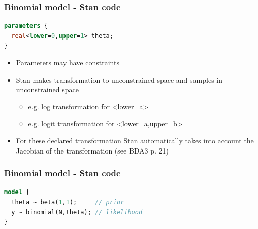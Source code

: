\documentclass[10pt]{beamer}
\begin{document}
\begin{frame}[fragile]

\frametitle{Binomial model - Stan code}

  {\small
\begin{lstlisting}[language=Stan]
parameters {
  real<lower=0,upper=1> theta;
}
\end{lstlisting}}

  \begin{itemize}
  \item Parameters may have constraints
  \item Stan makes transformation to unconstrained space and samples in unconstrained space
    \begin{itemize}
    \item e.g. log transformation for <lower=a>
    \item e.g. logit transformation for <lower=a,upper=b>
    \end{itemize}
  \item<2-> For these declared transformation Stan automatically takes
    into account the Jacobian of the transformation (see BDA3 p. 21)
  \end{itemize}
\end{frame}

\begin{frame}[fragile]

\frametitle{Binomial model - Stan code}

  {\small
\begin{lstlisting}[language=Stan]
model {
  theta ~ beta(1,1);     // prior
  y ~ binomial(N,theta); // likelihood
}
\end{lstlisting}}

\end{frame}
\end{document}
